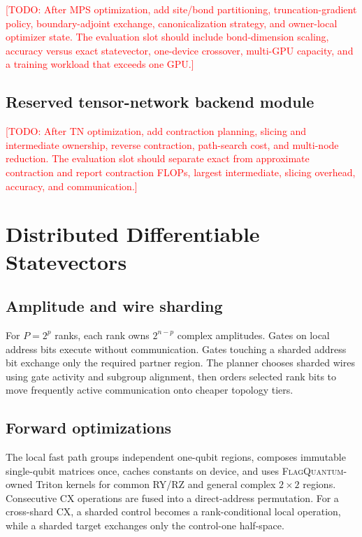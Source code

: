 \documentclass[10pt,twocolumn]{article}
\newcommand{\system}{\textsc{FlagQuantum}}
\newcommand{\todo}[1]{\textcolor{red}{[TODO: #1]}}
\begin{document}
\todo{After MPS optimization, add site/bond partitioning, truncation-gradient
policy, boundary-adjoint exchange, canonicalization strategy, and owner-local
optimizer state.  The evaluation slot should include bond-dimension scaling,
accuracy versus exact statevector, one-device crossover, multi-GPU capacity,
and a training workload that exceeds one GPU.}

\subsection{Reserved tensor-network backend module}
\label{sec:tn-placeholder}

\todo{After TN optimization, add contraction planning, slicing and intermediate
ownership, reverse contraction, path-search cost, and multi-node reduction.
The evaluation slot should separate exact from approximate contraction and
report contraction FLOPs, largest intermediate, slicing overhead, accuracy,
and communication.}

\section{Distributed Differentiable Statevectors}
\label{sec:method}

\subsection{Amplitude and wire sharding}

For \(P=2^p\) ranks, each rank owns \(2^{n-p}\) complex amplitudes.  Gates on
local address bits execute without communication.  Gates touching a sharded
address bit exchange only the required partner region.  The planner chooses
sharded wires using gate activity and subgroup alignment, then orders selected
rank bits to move frequently active communication onto cheaper topology tiers.

\subsection{Forward optimizations}

The local fast path groups independent one-qubit regions, composes immutable
single-qubit matrices once, caches constants on device, and uses
\system-owned Triton kernels for common RY/RZ and general complex \(2\times2\)
regions.  Consecutive CX operations are fused into a direct-address
permutation.  For a cross-shard CX, a sharded control becomes a rank-conditional
local operation, while a sharded target exchanges only the control-one
half-space.
\end{document}
